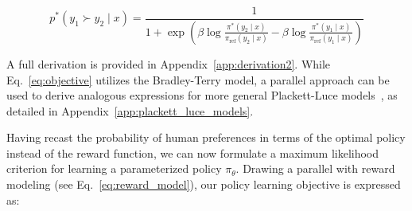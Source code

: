 \begin{equation}\label{eq:objective}
    p^*(y_1\succ y_2 \mid x)=\frac{1}{1 + \exp\left(\beta \log \frac{\pi^*(y_2\mid x)}{\pi_\text{ref}(y_2\mid x)} - \beta \log \frac{\pi^*(y_1\mid x)}{\pi_\text{ref}(y_1\mid x)}\right)}
\end{equation}

A full derivation is provided in Appendix~\ref{app:derivation2}. While Eq.~\ref{eq:objective} utilizes the Bradley-Terry model, a parallel approach can be used to derive analogous expressions for more general Plackett-Luce models~\citep{plackett1975analysis, luce2012individual}, as detailed in Appendix~\ref{app:plackett_luce_models}.

Having recast the probability of human preferences in terms of the optimal policy instead of the reward function, we can now formulate a maximum likelihood criterion for learning a parameterized policy $\pi_\theta$. Drawing a parallel with reward modeling (see Eq.~\ref{eq:reward_model}), our policy learning objective is expressed as:

